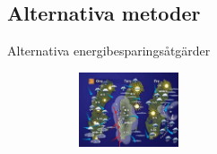 \subsection{Alternativa metoder}

\begin{frame}{Alternativa energibesparingsåtgärder}

\begin{figure}[hpbt]
\begin{subfigure}{0.45\textwidth}
\flushright
	\includegraphics[width=111px]{images/prognos.eps}
\end{subfigure}

\end{figure}
\end{frame}
